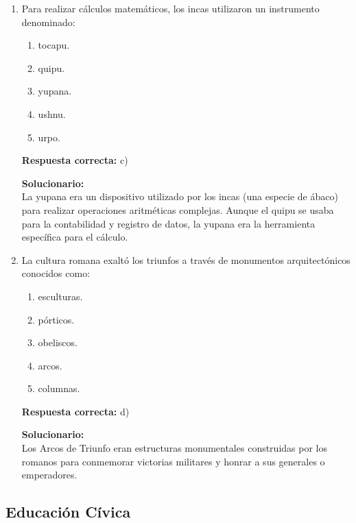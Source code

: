 \begin{enumerate}
	
\item Para realizar cálculos matemáticos, los incas utilizaron un instrumento denominado:

\begin{enumerate}[label=\alph*)]
	\item tocapu.
	\item quipu.
	\item yupana.
	\item ushnu.
	\item urpo.
\end{enumerate}

\textbf{Respuesta correcta:} c)

\vspace{2mm}
\textbf{Solucionario:}\\

La yupana era un dispositivo utilizado por los incas (una especie de ábaco) para realizar operaciones aritméticas complejas. Aunque el quipu se usaba para la contabilidad y registro de datos, la yupana era la herramienta específica para el cálculo.

\vspace{6mm}

\item La cultura romana exaltó los triunfos a través de monumentos arquitectónicos conocidos como:

\begin{enumerate}[label=\alph*)]
	\item esculturas.
	\item pórticos.
	\item obeliscos.
	\item arcos.
	\item columnas.
\end{enumerate}

\textbf{Respuesta correcta:} d)

\vspace{2mm}
\textbf{Solucionario:}\\
Los Arcos de Triunfo eran estructuras monumentales construidas por los romanos para conmemorar victorias militares y honrar a sus generales o emperadores.


	
	\vspace{6mm}
	
\end{enumerate}


\subsection*{Educación Cívica}

